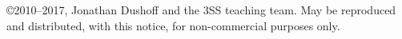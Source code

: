 \copyright 2010--2017, Jonathan Dushoff and the 3SS teaching team.  May be reproduced and distributed, with this notice, for non-commercial purposes only.
